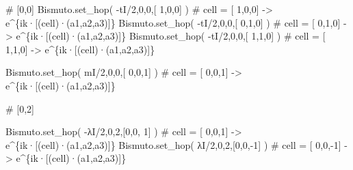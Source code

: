 \documentclass[
  letterpaper,
  DIV=11,
  numbers=noendperiod]{scrreprt}
\newenvironment{Shaded}{\begin{snugshade}}{\end{snugshade}}
\newcommand{\CommentTok}[1]{\textcolor[rgb]{0.37,0.37,0.37}{#1}}
\newcommand{\DecValTok}[1]{\textcolor[rgb]{0.68,0.00,0.00}{#1}}
\newcommand{\NormalTok}[1]{\textcolor[rgb]{0.00,0.23,0.31}{#1}}
\newcommand{\OperatorTok}[1]{\textcolor[rgb]{0.37,0.37,0.37}{#1}}
\begin{document}
\begin{Shaded}
\begin{Highlighting}[]
\CommentTok{\# [0,0]}
\NormalTok{Bismuto.set\_hop( }\OperatorTok{{-}}\NormalTok{tI}\OperatorTok{/}\DecValTok{2}\NormalTok{,}\DecValTok{0}\NormalTok{,}\DecValTok{0}\NormalTok{,[ }\DecValTok{1}\NormalTok{,}\DecValTok{0}\NormalTok{,}\DecValTok{0}\NormalTok{] ) }\CommentTok{\# cell = [ 1,0,0] {-}\textgreater{} e\^{}\{ik·[(cell)·(a1,a2,a3)]\}}
\NormalTok{Bismuto.set\_hop( }\OperatorTok{{-}}\NormalTok{tI}\OperatorTok{/}\DecValTok{2}\NormalTok{,}\DecValTok{0}\NormalTok{,}\DecValTok{0}\NormalTok{,[ }\DecValTok{0}\NormalTok{,}\DecValTok{1}\NormalTok{,}\DecValTok{0}\NormalTok{] ) }\CommentTok{\# cell = [ 0,1,0] {-}\textgreater{} e\^{}\{ik·[(cell)·(a1,a2,a3)]\}}
\NormalTok{Bismuto.set\_hop( }\OperatorTok{{-}}\NormalTok{tI}\OperatorTok{/}\DecValTok{2}\NormalTok{,}\DecValTok{0}\NormalTok{,}\DecValTok{0}\NormalTok{,[ }\DecValTok{1}\NormalTok{,}\DecValTok{1}\NormalTok{,}\DecValTok{0}\NormalTok{] ) }\CommentTok{\# cell = [ 1,1,0] {-}\textgreater{} e\^{}\{ik·[(cell)·(a1,a2,a3)]\}}

\NormalTok{Bismuto.set\_hop(  mI}\OperatorTok{/}\DecValTok{2}\NormalTok{,}\DecValTok{0}\NormalTok{,}\DecValTok{0}\NormalTok{,[ }\DecValTok{0}\NormalTok{,}\DecValTok{0}\NormalTok{,}\DecValTok{1}\NormalTok{] ) }\CommentTok{\# cell = [ 0,0,1] {-}\textgreater{} e\^{}\{ik·[(cell)·(a1,a2,a3)]\}}
\end{Highlighting}
\end{Shaded}

\begin{Shaded}
\begin{Highlighting}[]
\CommentTok{\# [0,2]}

\NormalTok{Bismuto.set\_hop( }\OperatorTok{{-}}\NormalTok{λI}\OperatorTok{/}\DecValTok{2}\NormalTok{,}\DecValTok{0}\NormalTok{,}\DecValTok{2}\NormalTok{,[}\DecValTok{0}\NormalTok{,}\DecValTok{0}\NormalTok{, }\DecValTok{1}\NormalTok{] ) }\CommentTok{\# cell = [ 0,0,1] {-}\textgreater{} e\^{}\{ik·[(cell)·(a1,a2,a3)]\}}
\NormalTok{Bismuto.set\_hop(  λI}\OperatorTok{/}\DecValTok{2}\NormalTok{,}\DecValTok{0}\NormalTok{,}\DecValTok{2}\NormalTok{,[}\DecValTok{0}\NormalTok{,}\DecValTok{0}\NormalTok{,}\OperatorTok{{-}}\DecValTok{1}\NormalTok{] ) }\CommentTok{\# cell = [ 0,0,{-}1] {-}\textgreater{} e\^{}\{ik·[(cell)·(a1,a2,a3)]\}}
\end{Highlighting}
\end{Shaded}
\end{document}
